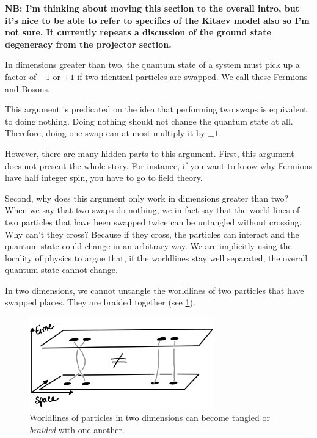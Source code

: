 \textbf{NB: I'm thinking about moving this section to the overall intro, but it's nice to be able to refer to specifics of the Kitaev model also so I'm not sure. It currently repeats a discussion of the ground state degeneracy from the projector section.}

In dimensions greater than two, the quantum state of a system must pick up a factor of \(-1\) or \(+1\) if two identical particles are swapped. We call these Fermions and Bosons.

This argument is predicated on the idea that performing two swaps is equivalent to doing nothing. Doing nothing should not change the quantum state at all. Therefore, doing one swap can at most multiply it by \(\pm 1\).

However, there are many hidden parts to this argument. First, this argument does not present the whole story. For instance, if you want to know why Fermions have half integer spin, you have to go to field theory.

Second, why does this argument only work in dimensions greater than two? When we say that two swaps do nothing, we in fact say that the world lines of two particles that have been swapped twice can be untangled without crossing. Why can't they cross? Because if they cross, the particles can interact and the quantum state could change in an arbitrary way. We are implicitly using the locality of physics to argue that, if the worldlines stay well separated, the overall quantum state cannot change.

In two dimensions, we cannot untangle the worldlines of two particles that have swapped places. They are braided together (see \cref{fig:braiding}).

\hypertarget{fig:braiding}{%
\begin{figure}
\centering
\includegraphics[width=0.71\textwidth,height=\textheight]{figure_code/amk_chapter/braiding.png}
\caption[{Braiding in Two Dimensions}]{Worldlines of particles in two dimensions can become tangled or \emph{braided} with one another.}
\label{fig:braiding}
\end{figure}
}

